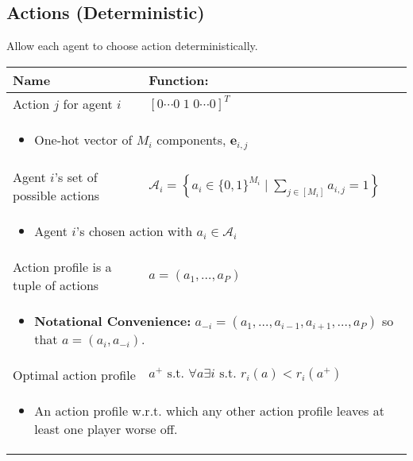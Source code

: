 \subsection{Actions (Deterministic)}
\begin{summary} Allow each agent to choose action deterministically.
    \begin{center}
        \begin{tabular}{ll}
            \toprule
            \textbf{Name} & \textbf{Function:} \\
            \midrule
            Action $j$ for agent $i$ & $[0 \cdots 0 \; 1 \; 0 \cdots 0]^T$ \\
            \midrule
            \multicolumn{2}{p{\linewidth}}{
                \begin{itemize}
                    \item One-hot vector of $M_i$ components, $\mathbf{e}_{i,j}$
                \end{itemize}} \\
            \midrule
            Agent $i$'s set of possible actions & $\mathcal{A}_i = \left\{a_i \in \{0,1\}^{M_i} \mid \sum_{j \in [M_i]} a_{i,j} = 1\right\}$ \\
            \multicolumn{2}{p{\linewidth}}{
                \begin{itemize}
                    \item Agent $i$'s chosen action with $a_i \in \mathcal{A}_i$
                \end{itemize}} \\
            \midrule
            Action profile is a tuple of actions & $a=(a_1,\ldots,a_P)$ \\
            \multicolumn{2}{p{\linewidth}}{
                \begin{itemize}
                    \item \textbf{Notational Convenience:} $a_{-i} = (a_1,\ldots,a_{i-1},a_{i+1},\ldots,a_P)$ so that $a=(a_i,a_{-i})$. 
                \end{itemize}} \\
            \midrule 
            Optimal action profile & $a^+ \text{ s.t. } \forall a \exists i \text{ s.t. } r_i(a) < r_i(a^+)$ \\
            \multicolumn{2}{p{\linewidth}}{
                \begin{itemize}
                    \item An action profile w.r.t. which any other action profile leaves at least one player worse off.

\end{itemize}}
\end{tabular}
\end{center}
\end{summary}
